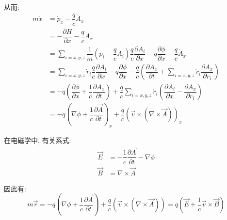 \documentclass[a4paper, 11pt]{article}
\begin{document}
\begin{spacing}{1.2}
        从而:
        \begin{equation}
          \begin{aligned}
            m\ddot{x} &= \dot{p}_x-\dfrac{q}{c}\dot{A}_x\\
                      &= -\dfrac{\partial{}H}{\partial{}x}-\dfrac{q}{c}\dot{A}_x\\
                      &= \sum_{i=x,y,z}\dfrac{1}{m}\left(p_i-\dfrac{q}{c}A_i\right)\dfrac{q}{c}
                      \dfrac{\partial{}A_i}{\partial{}x}-q\dfrac{\partial{}\phi}{\partial{}x}
                      -\dfrac{q}{c}\dot{A}_x \\
                      &= \sum_{i=x,y,z}\dot{r}_i\dfrac{q}{c}\dfrac{\partial{}A_i}{\partial{}x}
                      -q\dfrac{\partial{}\phi}{\partial{}x}-\dfrac{q}{c}\left(
                        \dfrac{\partial{}A_x}{\partial{}t}+\sum_{i=x,y,z}\dot{r}_i\dfrac{\partial{}A_x}
                        {\partial{}r_i}\right)\\
                      &=-q\left(\dfrac{\partial{}\phi}{\partial{}x}+\dfrac{1}{c}
                          \dfrac{\partial{}A_x}{\partial{}t}\right)
                          +\dfrac{q}{c}\sum_{i=x,y,z}\dot{r}_i\left(\dfrac{\partial{}A_i}{\partial{}x}-
                          \dfrac{\partial{}A_x}{\partial{}r_i}\right)\\
                      &= -q\left(\nabla\phi+\dfrac{1}{c}\dfrac{\partial{}\vec{A}}{\partial{}t}\right)_x
                         +\dfrac{q}{c}\left(\vec{v}\times\left(\nabla\times\vec{A}\right)\right)_x
          \end{aligned} 
        \end{equation}

        在电磁学中, 有关系式:
        \begin{equation}
          \label{4953:dcxgxs}
          \begin{aligned}
            \vec{E} &= -\dfrac{1}{c}\dfrac{\partial{}\vec{A}}{\partial{}t}-\nabla\phi\\
            \vec{B} &= \nabla\times\vec{A}
          \end{aligned}
        \end{equation}

        因此有:
        \begin{equation}
          m\ddot{\vec{r}} = -q\left(\nabla\phi+\dfrac{1}{c}\dfrac{\partial{}\vec{A}}{\partial{}t}\right)
          +\dfrac{q}{c}\left(\vec{v}\times\left(\nabla\times\vec{A}\right)\right)=
          q\left(\vec{E}+\dfrac{1}{c}\vec{v}\times\vec{B}\right)
        \end{equation}


\end{spacing}
\end{document}
